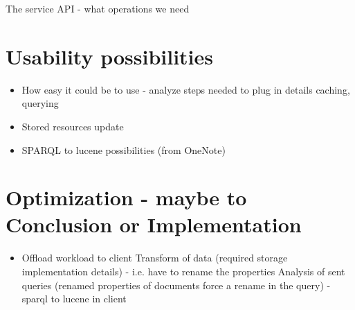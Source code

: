 
The service API - what operations we need

\section{Usability possibilities}
\begin{itemize}
	\item How easy it could be to use - analyze steps needed to plug in details caching, querying
	\item Stored resources update
	\item SPARQL to lucene possibilities (from OneNote)
\end{itemize}


\section{Optimization - maybe to Conclusion or Implementation}
\begin{itemize}
	\item Offload workload to client
		\subitem Transform of data (required storage implementation details) - i.e. have to rename the properties
		\subitem Analysis of sent queries (renamed properties of documents force a rename in the query) - sparql to lucene in client
\end{itemize}
